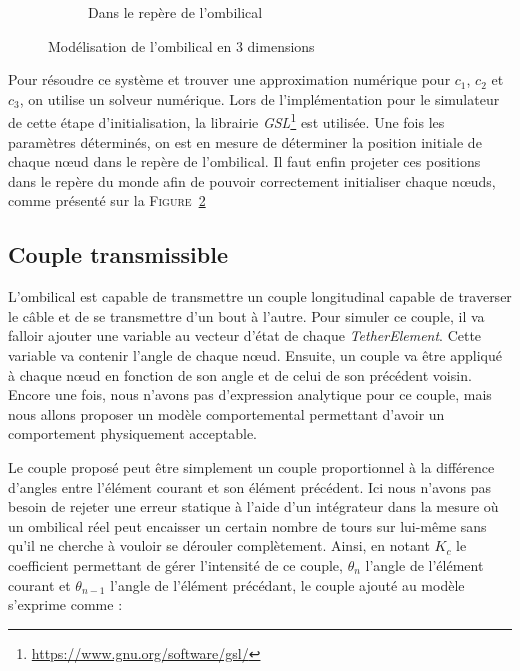 \begin{figure}[!htb]
\begin{subfigure}[b]{0.45\textwidth}
						\caption{Dans le repère de l'ombilical}
						\label{fig:2d_plot}
					\end{subfigure}
					\caption{Modélisation de l'ombilical en 3 dimensions}
					\label{fig:tether_plot}
				\end{figure}
				
				Pour résoudre ce système et trouver une approximation numérique pour $c_1$, $c_2$ et $c_3$, on utilise un solveur numérique. Lors de l'implémentation pour le simulateur de cette étape d'initialisation, la librairie \textit{GSL}\footnote{\url{https://www.gnu.org/software/gsl/}} est utilisée. Une fois les paramètres déterminés, on est en mesure de déterminer la position initiale de chaque n\oe ud dans le repère de l'ombilical. Il faut enfin projeter ces positions dans le repère du monde afin de pouvoir correctement initialiser chaque n\oe uds, comme présenté sur la \textsc{Figure}~\ref{fig:tether_plot}
			
			\subsection{Couple transmissible}

				L'ombilical est capable de transmettre un couple longitudinal capable de traverser le câble et de se transmettre d'un bout à l'autre. Pour simuler ce couple, il va falloir ajouter une variable au vecteur d'état de chaque \textit{TetherElement}. Cette variable va contenir l'angle de chaque n\oe ud. Ensuite, un couple va être appliqué à chaque n\oe ud en fonction de son angle et de celui de son précédent voisin. Encore une fois, nous n'avons pas d'expression analytique pour ce couple, mais nous allons proposer un modèle comportemental permettant d'avoir un comportement physiquement acceptable.

				Le couple proposé peut être simplement un couple proportionnel à la différence d'angles entre l'élément courant et son élément précédent. Ici nous n'avons pas besoin de rejeter une erreur statique à l'aide d'un intégrateur dans la mesure où un ombilical réel peut encaisser un certain nombre de tours sur lui-même sans qu'il ne cherche à vouloir se dérouler complètement. Ainsi, en notant $K_c$ le coefficient permettant de gérer l'intensité de ce couple, $\theta_n$ l'angle de l'élément courant et $\theta_{n-1}$ l'angle de l'élément précédant, le couple ajouté au modèle s'exprime comme :

